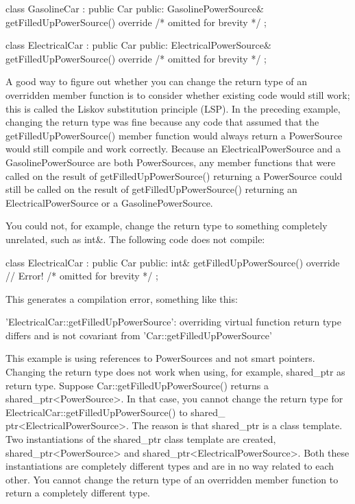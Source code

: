 \begin{cpp}
class GasolineCar : public Car
{
    public:
    GasolinePowerSource& getFilledUpPowerSource() override
    { /* omitted for brevity */ }
};

class ElectricalCar : public Car
{
    public:
    ElectricalPowerSource& getFilledUpPowerSource() override
    { /* omitted for brevity */ }
};
\end{cpp}

A good way to figure out whether you can change the return type of an overridden member function is to consider whether existing code would still work; this is called the Liskov substitution principle (LSP). In the preceding example, changing the return type was fine because any code that assumed that the getFilledUpPowerSource() member function would always return a PowerSource would still compile and work correctly. Because an ElectricalPowerSource and a GasolinePowerSource are both PowerSources, any member functions that were called on the result of getFilledUpPowerSource() returning a PowerSource could still be called on the result of getFilledUpPowerSource() returning an ElectricalPowerSource or a GasolinePowerSource.

You could not, for example, change the return type to something completely unrelated, such as int\&. The following code does not compile:

\begin{cpp}
class ElectricalCar : public Car
{
    public:
        int& getFilledUpPowerSource() override // Error!
        { /* omitted for brevity */ }
};
\end{cpp}

This generates a compilation error, something like this:

\begin{shell}
'ElectricalCar::getFilledUpPowerSource': overriding virtual function return type
differs and is not covariant from 'Car::getFilledUpPowerSource'
\end{shell}

This example is using references to PowerSources and not smart pointers. Changing the return type does not work when using, for example, shared\_ptr as return type. Suppose Car::getFilledUpPowerSource() returns a shared\_ptr<PowerSource>. In that case, you cannot change the return type for ElectricalCar::getFilledUpPowerSource() to shared\_ ptr<ElectricalPowerSource>. The reason is that shared\_ptr is a class template. Two instantiations of the shared\_ptr class template are created, shared\_ptr<PowerSource> and shared\_ptr<ElectricalPowerSource>. Both these instantiations are completely different types and are in no way related to each other. You cannot change the return type of an overridden member function to return a completely different type.


